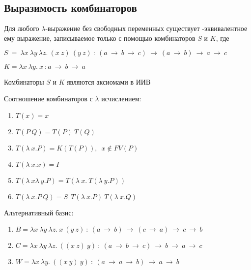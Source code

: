 	 \subsection{Выразимость комбинаторов}
	 \begin{statement}Для любого $\lambda$-выражение без свободных переменных существует \beta-эквивалентное ему выражение, записываемое только с помощью комбинаторов $S$ и $K$, где\end{statement}
	 $S\:=\:\lambda x\:\lambda y\:\lambda z.\:(x\:z)\:(y\:z)\: : \:(a\:\rightarrow\:b\:\rightarrow\:c)\:\rightarrow\:(a\:\rightarrow\:b)\:\rightarrow\:a\:\rightarrow\:c$\par 
	 $K=\lambda x\:\lambda y.\:x\: : a\:\rightarrow\:b\:\rightarrow\:a$\par 
	 \begin{statement}Комбинаторы $S$ и $K$ являются аксиомами в ИИВ\end{statement}
	\begin{statement}Соотношение комбинаторов с $\lambda$ исчислением:\end{statement}
	\begin{enumerate}
		\item $T(x)=x$
		\item $T(P\:Q)=T(P)\:T(Q)$
		\item $T(\lambda\:x.P)=K(T(P)),\enspace x\not\in FV(P)$
		\item $T(\lambda\:x.x)=I$
		\item $T(\lambda\:x\lambda\:y.P)=T(\lambda\:x.\:T(\lambda\:y.P))$
		\item $T(\lambda\:x.P\:Q)=S\:\:T(\lambda\:x.P)\:T(\lambda\:x.Q)$
	\end{enumerate}
	\begin{statement}Альтернативный базис:\end{statement}
	 \begin{enumerate}
		\item $B=\lambda x\:\lambda y\:\lambda z.\:x\:(y\:z)\: : \:(a\:\rightarrow\:b)\:\rightarrow\:(c\:\rightarrow\:a)\:\rightarrow\:c\:\rightarrow\:b$
		\item $C=\lambda x\:\lambda y\:\lambda z.\:((x\:z)\:y)\: : \:(a\:\rightarrow\:b\:\rightarrow\:c)\:\rightarrow\:b\:\rightarrow\:a\:\rightarrow\:c$
		\item $W=\lambda x\:\lambda y.\:((x\:y)\:y)\: : \: (a\:\rightarrow\:a\:\rightarrow\:b)\:\rightarrow\:a\:\rightarrow\:b$
		\\\\\\
	 \end{enumerate}
